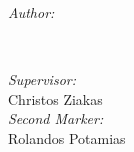 \begin{titlepage}
\begin{minipage}{0.4\textwidth}
\begin{flushleft} \large
\emph{Author:}\\
\@author %
\end{flushleft}
\end{minipage}
~
\begin{minipage}{0.4\textwidth}
\begin{flushright} \large
\emph{Supervisor:} \\
Christos Ziakas \\[1.2em]
\emph{Second Marker:} \\
Rolandos Potamias
\end{flushright}
\end{minipage}\\[2cm]


{\large \@date}\\[2cm]
\makeatother


\vfill %

\end{titlepage}